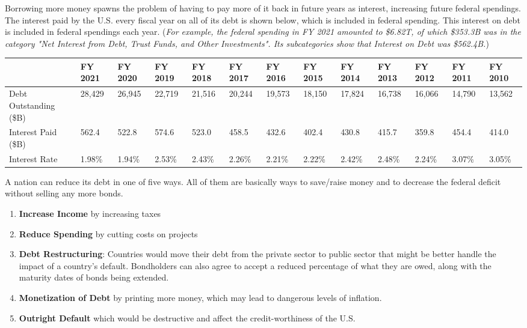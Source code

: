 \documentclass{article}
\begin{document}
    Borrowing more money spawns the problem of having to pay more of it back in future years as interest, increasing future federal spendings. The interest paid by the U.S. every fiscal year on all of its debt is shown below, which is included in federal spending. This interest on debt is included in federal spendings each year. (\textit{For example, the federal spending in FY 2021 amounted to \$6.82T, of which \$353.3B was in the category "Net Interest from Debt, Trust Funds, and Other Investments". Its subcategories show that Interest on Debt was \$562.4B.})

    \begin{table}[h]
      \begin{tabular}{|l|l|l|l|l|l|l|l|l|l|l|l|l|}
      \hline
      & FY 2021 & FY 2020 & FY 2019 & FY 2018 & FY 2017 & FY 2016 & FY 2015 & FY 2014 & FY 2013 & FY 2012 & FY 2011 & FY 2010 \\ \hline
      Debt Outstanding (\$B) & 28,429 & 26,945 & 22,719 & 21,516 & 20,244 & 19,573 & 18,150 & 17,824 & 16,738 & 16,066 & 14,790 & 13,562 \\ \hline
      Interest Paid (\$B) & 562.4 & 522.8 & 574.6 & 523.0 & 458.5 & 432.6 & 402.4 & 430.8 & 415.7 & 359.8 & 454.4 & 414.0 \\ \hline
      Interest Rate & 1.98\% & 1.94\% & 2.53\% & 2.43\% & 2.26\% & 2.21\% & 2.22\% & 2.42\% & 2.48\% & 2.24\% & 3.07\% & 3.05\% \\ \hline
      \end{tabular}
    \end{table}

    A nation can reduce its debt in one of five ways. All of them are basically ways to save/raise money and to decrease the federal deficit without selling any more bonds.
    \begin{enumerate}
      \item \textbf{Increase Income} by increasing taxes
      \item \textbf{Reduce Spending} by cutting costs on projects
      \item \textbf{Debt Restructuring}: Countries would move their debt from the private sector to public sector that might be better handle the impact of a country's default. Bondholders can also agree to accept a reduced percentage of what they are owed, along with the maturity dates of bonds being extended.
      \item \textbf{Monetization of Debt} by printing more money, which may lead to dangerous levels of inflation.
      \item \textbf{Outright Default} which would be destructive and affect the credit-worthiness of the U.S.
    \end{enumerate}
\end{document}
